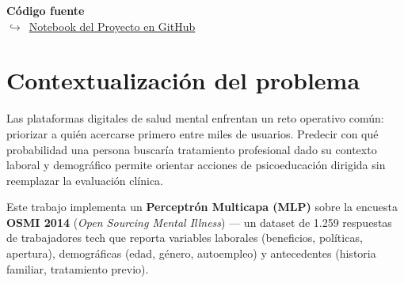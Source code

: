 \documentclass[10pt,a4paper,twocolumn]{article}
\newcommand{\githuburl}{https://github.com/georgenton/UIDE-Aprendizaje-Profundo/blob/main/semana-1/notebook/MLP\_Mental\_Health\_Survey.ipynb}
\begin{document}

\begin{codigofuente}
\textbf{Código fuente}\\[2pt]
$\hookrightarrow$~\href{\githuburl}{Notebook del Proyecto en GitHub}
\end{codigofuente}

\section{Contextualización del problema}

Las plataformas digitales de salud mental enfrentan un reto operativo común: priorizar a quién acercarse primero entre miles de usuarios. Predecir con qué probabilidad una persona buscaría tratamiento profesional dado su contexto laboral y demográfico permite orientar acciones de psicoeducación dirigida sin reemplazar la evaluación clínica.

Este trabajo implementa un \textbf{Perceptrón Multicapa (MLP)} sobre la encuesta \textbf{OSMI 2014} (\textit{Open Sourcing Mental Illness}) — un dataset de 1.259 respuestas de trabajadores tech que reporta variables laborales (beneficios, políticas, apertura), demográficas (edad, género, autoempleo) y antecedentes (historia familiar, tratamiento previo).
\end{document}
